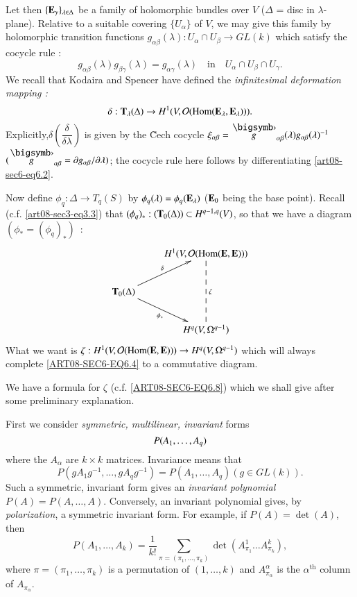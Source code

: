 Let then $\{\mathbf{E}_{\gamma}\}_{\lambda\in\Delta}$ be a family of holomorphic bundles over $V$ ($\Delta$ = disc in $\lambda$-plane). Relative to a suitable covering $\{U_{\alpha}\}$ of $V$, we may give this family by holomorphic transition functions $g_{\alpha\beta}(\lambda):U_{\alpha}\cap U_{\beta}\to GL(k)$ which satisfy the cocycle rule :
\begin{equation}
g_{\alpha\beta}(\lambda)g_{\beta\gamma}(\lambda)=g_{\alpha\gamma}(\lambda)\text{~~ in~~ } U_{\alpha}\cap U_{\beta}\cap U_{\gamma}.\label{art08-sec6-eq6.2}
\end{equation}
We recall that Kodaira and Spencer \cite{art08-key15} have defined the {\em infinitesimal deformation mapping :}
\begin{equation}
\delta : \mathbf{T}_{\lambda}(\Delta)\to H^{1}(V,\mathcal{O}(\operatorname{\mathrm{Hom}}(\mathbf{E}_{\lambda},\mathbf{E}_{\lambda}))).\label{art08-sec6-eq6.3}
\end{equation}
Explicitly,\pageoriginale $\delta\left(\dfrac{\delta}{\delta\lambda}\right)$ is given by the \~Cech cocycle $\xi_{\alpha\beta}=\overdot{g}_{\alpha\beta}(\lambda)g_{\alpha\beta}(\lambda)^{-1}$ $(\overdot{g}_{\alpha\beta}=\partial g_{\alpha\beta}/\partial\lambda)$; the cocycle rule here follows by differentiating \eqref{art08-sec6-eq6.2}. 

Now define $\phi_{q}:\Delta\to T_{q}(S)$ by $\phi_{q}(\lambda)=\phi_{q}(\mathbf{E}_{\lambda})$ ($\mathbf{E}_{0}$ being the base point). Recall (c.f. \eqref{art08-sec3-eq3.3}) that $(\phi_{q})_{*}:(\mathbf{T}_{0}(\Delta))\subset H^{q-1,q}(V)$, so that we have a diagram $(\phi_{*}=(\phi_{q})_{*})$~:
\begin{equation}
\vcenter{\xymatrix{
 & H^{1}(V,\mathcal{O}(\Hom(\bfE,\bfE)))\ar@{--}[dd]^{\zeta}\\
\bfT_{0}(\Delta)\ar[ur]^-{\delta}\ar[dr]_-{\phi_{*}} & \\
 & H^{q}(V,\Omega^{q-1})
}}\label{ART08-SEC6-EQ6.4}
\end{equation}
What we want is $\zeta:H^{1}(V,\mathcal{O}(\operatorname{\mathrm{Hom}}(\mathbf{E},\mathbf{E})))\to H^{q}(V,\Omega^{q-1})$ which will always complete \eqref{ART08-SEC6-EQ6.4} to a commutative diagram.

We have a formula for $\zeta$ (c.f. \eqref{ART08-SEC6-EQ6.8}) which we shall give after some preliminary explanation.

First we consider {\em symmetric, multilinear, invariant} forms 
$$
P(A_{1},\ldots,\break A_{q})
$$ 
where the $A_{\alpha}$ are $k\times k$ matrices. Invariance means that 
$$
P(gA_{1}g^{-1},\ldots,gA_{q}g^{-1})=P(A_{1},\ldots,A_{q}) (g\in GL(k)).
$$ 
Such a symmetric, invariant form gives an {\em invariant polynomial} $P(A)=P(A,\ldots,A)$. Conversely, an invariant polynomial gives, by {\em polarization}, a symmetric invariant form. For example, if $P(A)=\det(A)$, then
\begin{equation}
P(A_{1},\ldots,A_{k})=\dfrac{1}{k!}\sum\limits_{\pi=(\pi_{1},\ldots,\pi_{k})}\det (A^{1}_{\pi_{1}}\ldots A^{k}_{\pi_{k}}),\label{art08-sec6-eq6.5}
\end{equation}
where $\pi=(\pi_{1},\ldots,\pi_{k})$ is a permutation of $(1,\ldots,k)$ and $A^{\alpha}_{\pi_{\alpha}}$ is the $\alpha^{\text{th}}$ column of $A_{\pi_{\alpha}}$.

